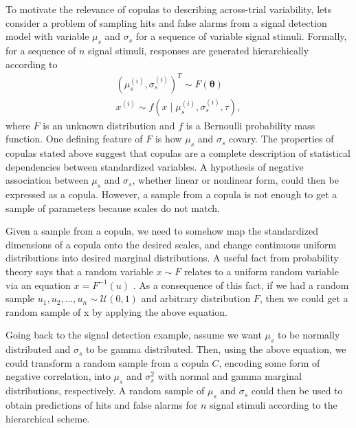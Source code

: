 \documentclass[12pt]{report}
\begin{document}
To motivate the relevance of copulas to describing across-trial variability, lets consider a problem of sampling hits and false alarms from a signal detection model with variable $\mu_s$ and $\sigma_s$ for a sequence of variable signal stimuli.
Formally, for a sequence of $n$ signal stimuli, responses are generated hierarchically according to
\begin{eqnarray*}
(\mu_s^{(i)}, \sigma_s^{(i)})^T \sim F(\boldsymbol{\theta}) \\
x^{(i)} \sim f(x \mid \mu_s^{(i)}, \sigma_s^{(i)}, \tau),
\end{eqnarray*}
where $F$ is an unknown distribution and $f$ is a Bernoulli probability mass function. One defining feature of $F$ is how $\mu_s$ and $\sigma_s$ covary. The properties of copulas stated above suggest that copulas are a complete description of statistical dependencies between standardized variables. A hypothesis of negative association between $\mu_s$ and $\sigma_s$, whether linear or nonlinear form, could then be expressed as a copula. However, a sample from a copula is not enough to get a sample of parameters because scales do not match.

Given a sample from a copula, we need to somehow map the standardized dimensions of a copula onto the desired scales, and change continuous uniform distributions into desired marginal distributions. A useful fact from probability theory says that a random variable $x \sim F$ relates to a uniform random variable via an equation $x = F^{-1}(u)$ \citep{CasBer2002}. As a consequence of this fact, if we had a random sample $u_1,u_2,\ldots,u_n \sim \mathcal{U}(0,1)$ and arbitrary distribution $F$, then we could get a random sample of x by applying the above equation. 

Going back to the signal detection example, assume we want $\mu_s$ to be normally distributed and $\sigma_s$ to be gamma distributed. Then, using the above equation, we could transform a random sample from a copula $C$, encoding some form of negative correlation, into $\mu_s$ and $\sigma_s^2$ with normal and gamma marginal distributions, respectively. A random sample of $\mu_s$ and $\sigma_s$ could then be used to obtain predictions of hits and false alarms for $n$ signal stimuli according to the hierarchical scheme.
\end{document}
